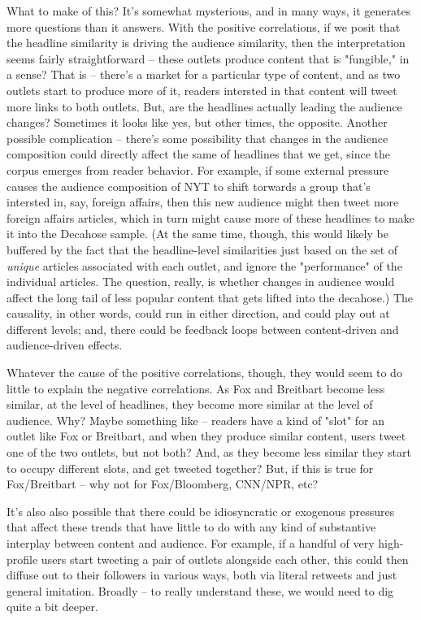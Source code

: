 \documentclass{scrartcl}
\begin{document}
What to make of this? It's somewhat mysterious, and in many ways, it generates more questions than it answers. With the positive correlations, if we posit that the headline similarity is driving the audience similarity, then the interpretation seems fairly straightforward -- these outlets produce content that is "fungible," in a sense? That is -- there's a market for a particular type of content, and as two outlets start to produce more of it, readers intersted in that content will tweet more links to both outlets. But, are the headlines actually leading the audience changes? Sometimes it looks like yes, but other times, the opposite. Another possible complication -- there's some possibility that changes in the audience composition could directly affect the same of headlines that we get, since the corpus emerges from reader behavior. For example, if some external pressure causes the audience composition of NYT to shift torwards a group that's intersted in, say, foreign affairs, then this new audience might then tweet more foreign affairs articles, which in turn might cause more of these headlines to make it into the Decahose sample. (At the same time, though, this would likely be buffered by the fact that the headline-level similarities just based on the set of \textit{unique} articles associated with each outlet, and ignore the "performance" of the individual articles. The question, really, is whether changes in audience would affect the long tail of less popular content that gets lifted into the decahose.) The causality, in other words, could run in either direction, and could play out at different levels; and, there could be feedback loops between content-driven and audience-driven effects.

Whatever the cause of the positive correlations, though, they would seem to do little to explain the negative correlations. As Fox and Breitbart become less similar, at the level of headlines, they become more similar at the level of audience. Why? Maybe something like -- readers have a kind of "slot" for an outlet like Fox or Breitbart, and when they produce similar content, users tweet one of the two outlets, but not both? And, as they become less similar they start to occupy different slots, and get tweeted together? But, if this is true for Fox/Breitbart -- why not for Fox/Bloomberg, CNN/NPR, etc?

It's also also possible that there could be idiosyncratic or exogenous pressures that affect these trends that have little to do with any kind of substantive interplay between content and audience. For example, if a handful of very high-profile users start tweeting a pair of outlets alongside each other, this could then diffuse out to their followers in various ways, both via literal retweets and just general imitation. Broadly -- to really understand these, we would need to dig quite a bit deeper.
\end{document}
